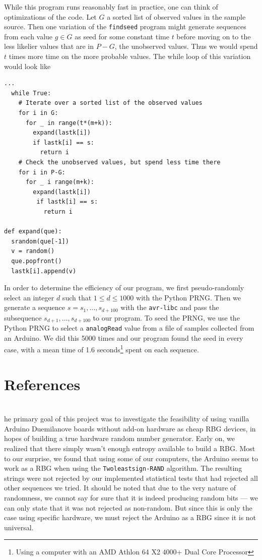 \documentclass[a4paper]{article}           %
\newcommand{\tmpsection}[1]{}
\let\tmpsection=\section
\renewcommand{\section}[2]{

    \ifthenelse{
      \equal{#2}{*} %
    }
    {
      \tmpsection{References}
      \tmpsection{\sc{#2} }
    }
    {\tmpsection{\sc{#1} } }
      

}
\begin{document}
While this program runs reasonably fast in practice, one can think of optimizations of the code. Let $G$ a sorted list of observed values in the sample source. Then one variation of the \texttt{findseed} program might generate sequences from each value $g \in G$ as seed for some constant time $t$ before moving on to the less likelier values that are in $P-G$, the unobserved values. Thus we would spend $t$ times more time on the more probable values. The while loop of this variation would look like

\begin{lstlisting}[caption=One possible optimization of the \texttt{findseed} program]
...
  while True:
    # Iterate over a sorted list of the observed values
    for i in G:
      for _ in range(t*(m+k)):
        expand(lastk[i])
        if lastk[i] == s:
          return i
    # Check the unobserved values, but spend less time there
    for i in P-G:
      for _ i range(m+k):
        expand(lastk[i])
         if lastk[i] == s:
           return i

def expand(que):
  srandom(que[-1])
  v = random()
  que.popfront()
  lastk[i].append(v)
\end{lstlisting}

In order to determine the efficiency of our program, we first pseudo-randomly select an integer $d$ such that $1 \leq d \leq 1000$ with the Python PRNG. Then we generate a sequence $s=s_1, \ldots, s_{d+100}$ with the \texttt{avr-libc} and pass the subsequence $s_{d+1}, \ldots, s_{d+100}$ to our program. To seed the PRNG, we use the Python PRNG to select a \texttt{analogRead} value from a file of samples collected from an Arduino. We did this 5000 times and our program found the seed in every case, with a mean time of 1.6 seconds\footnote{Using a computer with an AMD Athlon 64 X2 4000+ Dual Core Processor} spent on each sequence. 

\section{Conclusions}

The primary goal of this project was to investigate the feasibility of using vanilla Arduino Duemilanove boards without add-on hardware as cheap RBG devices, in hopes of building a true hardware random number generator. Early on, we realized that there simply wasn't enough entropy available to build a RBG. Most to our surprise, we found that using some of our computers, the Arduino seems to work as a RBG when using the \texttt{Twoleastsign-RAND} algorithm. The resulting strings were not rejected by our implemented statistical tests that had rejected all other sequences we tried. It should be noted that due to the very nature of randomness, we cannot say for sure that it is indeed producing random bits --- we can only state that it was not rejected as non-random. But since this is only the case using specific hardware, we must reject the Arduino as a RBG since it is not universal. 
\end{document}
